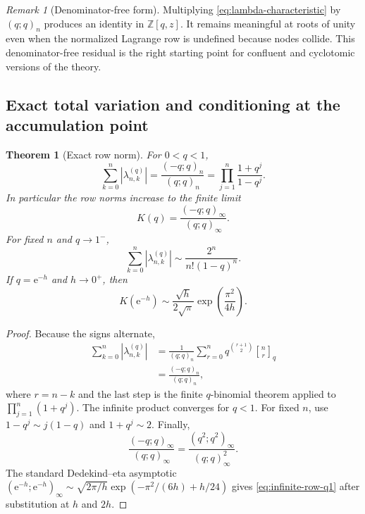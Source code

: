 \documentclass[11pt,a4paper,oneside]{article}
\newtheorem{theorem}{Theorem}[section]
\theoremstyle{definition}
\theoremstyle{remark}
\newtheorem{remark}[remark]{Remark}
\newcommand{\Z}{\mathbb Z}
\newcommand{\e}{\mathrm e}
\newcommand{\abs}[1]{\left\lvert#1\right\rvert}
\newcommand{\qbinom}[3]{\genfrac{[}{]}{0pt}{}{#1}{#2}_{#3}}
\begin{document}
\begin{remark}[Denominator-free form]
Multiplying \eqref{eq:lambda-characteristic} by $(q;q)_n$ produces an identity
in $\Z[q,z]$.  It remains meaningful at roots of unity even when the normalized
Lagrange row is undefined because nodes collide.  This denominator-free
residual is the right starting point for confluent and cyclotomic versions of
the theory.
\end{remark}

\subsection{Exact total variation and conditioning at the accumulation point}

\begin{theorem}[Exact row norm]
\label{thm:row-norm}
For $0<q<1$,
\begin{equation}
 \sum_{k=0}^n\abs{\lambda_{n,k}^{(q)}}
 =\frac{(-q;q)_n}{(q;q)_n}
 =\prod_{j=1}^n\frac{1+q^j}{1-q^j}.
 \label{eq:row-norm}
\end{equation}
In particular the row norms increase to the finite limit
\begin{equation}
 K(q)=\frac{(-q;q)_\infty}{(q;q)_\infty}.
 \label{eq:row-norm-limit}
\end{equation}
For fixed $n$ and $q\to1^-$,
\begin{equation}
 \sum_{k=0}^n\abs{\lambda_{n,k}^{(q)}}
 \sim\frac{2^n}{n!(1-q)^n}.
 \label{eq:finite-row-q1}
\end{equation}
If $q=\e^{-h}$ and $h\to0^+$, then
\begin{equation}
 K(\e^{-h})
 \sim\frac{\sqrt h}{2\sqrt\pi}
 \exp\!\left(\frac{\pi^2}{4h}\right).
 \label{eq:infinite-row-q1}
\end{equation}
\end{theorem}

\begin{proof}
Because the signs alternate,
\begin{align*}
 \sum_{k=0}^n|\lambda_{n,k}^{(q)}|
 &=\frac1{(q;q)_n}\sum_{r=0}^n
 q^{\binom{r+1}{2}}\qbinom nrq\\
 &=\frac{(-q;q)_n}{(q;q)_n},
\end{align*}
where $r=n-k$ and the last step is the finite $q$-binomial theorem applied to
$\prod_{j=1}^n(1+q^j)$.  The infinite product converges for $q<1$.
For fixed $n$, use $1-q^j\sim j(1-q)$ and $1+q^j\sim2$.
Finally,
\[
 \frac{(-q;q)_\infty}{(q;q)_\infty}
 =\frac{(q^2;q^2)_\infty}{(q;q)_\infty^2}.
\]
The standard Dedekind--eta asymptotic
$(\e^{-h};\e^{-h})_\infty\sim
\sqrt{2\pi/h}\exp(-\pi^2/(6h)+h/24)$ gives
\eqref{eq:infinite-row-q1} after substitution at $h$ and $2h$.
\end{proof}
\end{document}
